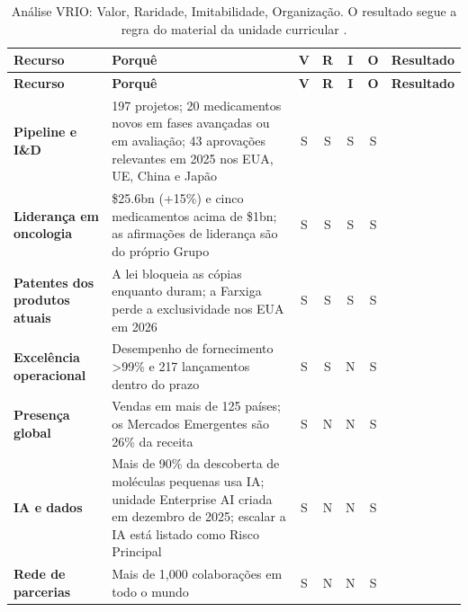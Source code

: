 \begin{xltabular}{\linewidth}{@{}N{2.4cm}Yccccp{2.5cm}@{}}
\caption{Análise VRIO: Valor, Raridade, Imitabilidade, Organização. O resultado segue a regra do material da unidade curricular \cite[p.~26]{PLAN}.}\label{tab:vrio}\\*
\toprule
\textbf{Recurso} & \textbf{Porquê} & \textbf{V} & \textbf{R} & \textbf{I} & \textbf{O} & \textbf{Resultado} \\*
\midrule
\endfirsthead
\toprule
\textbf{Recurso} & \textbf{Porquê} & \textbf{V} & \textbf{R} & \textbf{I} & \textbf{O} & \textbf{Resultado} \\*
\midrule
\endhead
\bottomrule
\endfoot
\textbf{Pipeline e I\&D} & 197 projetos; 20 medicamentos novos em fases avançadas ou em avaliação; 43 aprovações relevantes em 2025 nos EUA, UE, China e Japão \cite[pp.~28, 30]{AR} & S & S & S & S &  \\
\textbf{Liderança em oncologia} & \$25.6bn (+15\%) e cinco medicamentos acima de \$1bn; as afirmações de liderança são do próprio Grupo \cite[pp.~4, 12--14]{AR} & S & S & S & S &  \\
\textbf{Patentes dos produtos atuais} & A lei bloqueia as cópias enquanto duram; a Farxiga perde a exclusividade nos EUA em 2026 \cite[pp.~9, 33]{AR} & S & S & S & S &  \\
\textbf{Excelência operacional} & Desempenho de fornecimento >99\% e 217 lançamentos dentro do prazo \cite[pp.~4, 27]{AR} & S & S & N & S &   \\
\textbf{Presença global} & Vendas em mais de 125 países; os Mercados Emergentes são 26\% da receita \cite[pp.~2, 32--33]{AR} & S & N & N & S &   \\
\textbf{IA e dados} & Mais de 90\% da descoberta de moléculas pequenas usa IA; unidade Enterprise AI criada em dezembro de 2025; escalar a IA está listado como Risco Principal \cite[pp.~36, 48]{AR} & S & N & N & S &   \\
\textbf{Rede de parcerias} & Mais de 1,000 colaborações em todo o mundo \cite[p.~37]{AR} & S & N & N & S &   \\
\end{xltabular}

